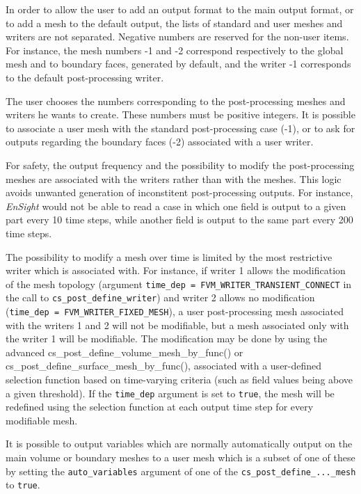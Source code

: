 {{{In order to allow the user to add an output format to
the main output format, or to add a mesh to the default
output, the lists of standard and user meshes and writers are not
separated. Negative numbers are reserved for the non-user items. For
instance, the mesh numbers -1 and -2 correspond respectively to the global
mesh and to boundary faces, generated by default, and the writer -1
corresponds to the default post-processing writer.

The user chooses the numbers corresponding to the post-processing
meshes and writers he wants to create. These numbers must be positive
integers. It is possible to associate a user mesh with the standard
post-processing case (-1), or to ask for outputs regarding the boundary
faces (-2) associated with a user writer.

For safety, the output frequency and the possibility to modify the
post-processing meshes are associated with the writers rather than
with the meshes. This logic avoids unwanted generation of
inconstitent post-processing outputs. For instance, {\em EnSight} would not
be able to read a case in which one field is output to a given part
every 10 time steps, while another field is output to the same part
every 200 time steps.

The possibility to modify a mesh over time is limited by the most restrictive
writer which is associated with. For instance, if writer
1 allows the modification of the mesh topology (argument \texttt{time\_dep
= FVM\_WRITER\_TRANSIENT\_CONNECT} in the call to \texttt{cs\_post\_define\_writer}) and writer 2 allows no
modification (\texttt{time\_dep = FVM\_WRITER\_FIXED\_MESH}),
a user post-processing mesh
associated with the writers 1 and 2 will not be modifiable, but a
mesh associated only with the writer 1 will be modifiable. The
modification may be done by using the advanced
cs\_post\_define\_volume\_mesh\_by\_func() or
cs\_post\_define\_surface\_mesh\_by\_func(), associated with a user-defined
selection function based on time-varying criteria (such as field values
being above a given threshold). If the \texttt{time\_dep} argument is
set to \texttt{true}, the mesh will be redefined using the selection
function at each output time step for every modifiable mesh.

It is possible to output variables which are normally automatically
output on the main volume or boundary meshes to a user mesh which is a subset
of one of these by setting the \texttt{auto\_variables} argument of
one of the \texttt{cs\_post\_define\_...\_mesh} to \texttt{true}.

}}}
